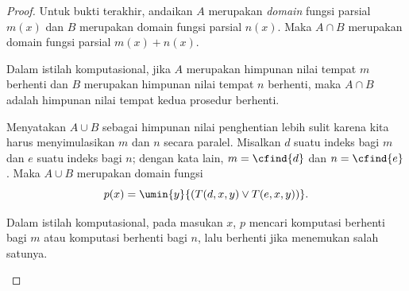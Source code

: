 \documentclass[../../../include/open-logic-section]{subfiles}
\begin{document}
\begin{proof}
Untuk bukti terakhir, andaikan $A$ merupakan \emph{domain} fungsi parsial
$m(x)$ dan $B$ merupakan domain fungsi parsial $n(x)$. Maka $A \cap B$
merupakan domain fungsi parsial $m(x) + n(x)$.

\begin{explain}
Dalam istilah komputasional, jika $A$ merupakan himpunan nilai tempat $m$
berhenti dan $B$ merupakan himpunan nilai tempat $n$ berhenti, maka $A \cap B$
adalah himpunan nilai tempat kedua prosedur berhenti.
\end{explain}

Menyatakan $A \cup B$ sebagai himpunan nilai penghentian lebih sulit karena
kita harus menyimulasikan $m$ dan $n$ secara paralel. Misalkan $d$ suatu indeks
bagi $m$ dan $e$ suatu indeks bagi $n$; dengan kata lain, $m = \cfind{d}$ dan
$n = \cfind{e}$. Maka $A \cup B$ merupakan domain fungsi
\[
p(x) = \umin{y}{(T(d,x,y) \lor T(e,x,y))}.
\]
\begin{explain}
Dalam istilah komputasional, pada masukan $x$, $p$ mencari komputasi berhenti
bagi $m$ atau komputasi berhenti bagi $n$, lalu berhenti jika menemukan salah
satunya.
\end{explain}
\end{proof}
\end{document}
